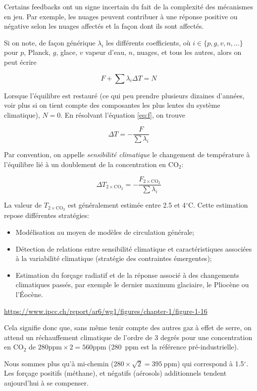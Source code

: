 Certains feedbacks ont un signe incertain du fait de la complexité des mécanismes en jeu. Par exemple, les nuages peuvent contribuer à une réponse positive ou négative selon les nuages affectés et la façon dont ils sont affectés. 

Si on note, de façon générique $\lambda_i$ les différents coefficients, où $i\in\{p, g, v, n,  \ldots\}$ pour $p$, Planck, $g$, glace, $v$ vapeur d'eau, $n$, nuages,  et tous les autres, alors on peut écrire 

\begin{equation}\label{eq:f}
  F + \sum \lambda_i \Delta T = N
\end{equation}

Lorsque l'équilibre est restauré (ce qui peu prendre plusieurs dizaines d'années, voir plus si on tient compte des composantes les plus lentes du système climatique), $N=0$. En résolvant l'équation \eqref{eq:f}, on trouve 

\begin{equation}
  \Delta T = - \frac{F}{\sum \lambda_i}
\end{equation}



Par convention, on appelle \emph{sensibilité climatique} le changement de température à l'équilibre lié à un doublement de la concentration en CO$_2$:

\def\cc{\ensuremath{2\times\text{CO}_2}}

\begin{equation}
  \Delta T_{\cc} = - \frac{F_{\cc}}{\sum \lambda_i}
\end{equation}

La valeur de $T_{\cc}$ est généralement estimée entre 2.5 et 4$^\circ$C. Cette estimation repose différentes stratégies: 

\begin{itemize}
  \item Modélisation au moyen de modèles de circulation générale;
  \item Détection de relations entre sensibilité climatique et caractéristiques associées à la variabilité climatique (stratégie des contraintes émergentes);
  \item Estimation du forçage radiatif et de la réponse associé à des changements climatiques passés, par exemple le dernier maximum glaciaire, le Pliocène ou l'Éocène.
\end{itemize}

\url{https://www.ipcc.ch/report/ar6/wg1/figures/chapter-1/figure-1-16}

Cela signifie donc que, sans même tenir compte des autres gaz à effet de serre, on attend un réchauffement climatique de l'ordre de 3 degrés pour une concentration en CO$_2$ de $280\text{ppm} \times 2=560$ppm (280\ ppm est la référence pré-industrielle). 

Nous sommes plus qu'à  mi-chemin ($280 \times \sqrt 2 = 395\ $ppm) qui correspond à 1.5$^\circ$. Les forçage positifs (méthane), et négatifs (aérosols) additionnels tendent aujourd'hui à se compenser. 



